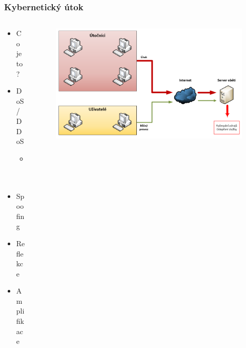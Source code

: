 \documentclass[%
  12pt,       				%
	t,                  %
	aspectratio=1610,   %
	unicode,						%
czech,              %
]{beamer}				    	%
\begin{document}
\begin{frame}
	\frametitle{Kybernetický útok}
	\begin{columns}[T] 								%
		\begin{column}{0.3\textwidth}		%
			\begin{itemize}
				\item Co je to?
				\item DoS/DDoS
					\begin{itemize}
						\item C\&C
					\end{itemize}
				\item Spoofing
				\item Reflekce
				\item Amplifikace
			\end{itemize}
		\end{column}
		\begin{column}{0.7\textwidth}
			\begin{figure}%
				\centering
				\vspace{0.1cm}	              %
				\includegraphics[width=0.99\columnwidth]{obrazky/ddos_schema.png}
			\end{figure}
		\end{column}
	\end{columns}											%
\end{frame} 
\end{document}
